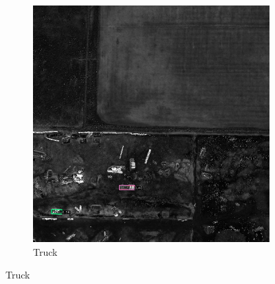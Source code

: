 \begin{figure}[h!]
\begin{subfigure}[t]{0.38\textwidth}
        \includegraphics[width=\linewidth]{images/015Results/03ablation/comp_images/ndvi/212.png}
        \caption{Truck}
    \end{subfigure}
    

\end{figure}
